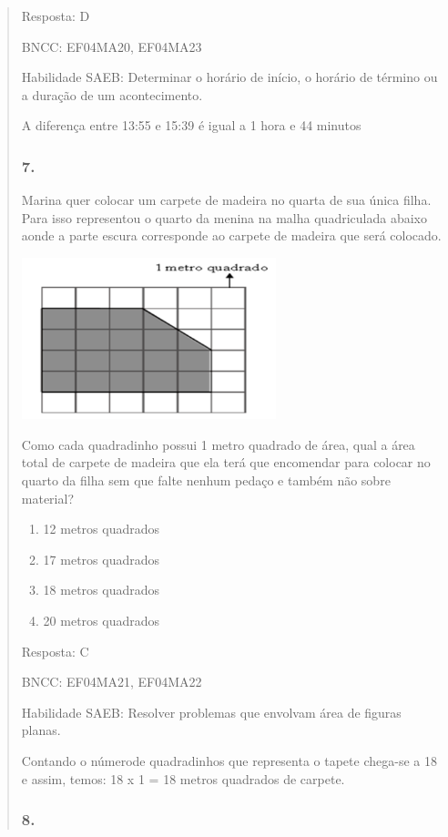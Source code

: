 \begin{enumerate}
\begin{escolha}
\begin{enumerate}
\begin{itemize}
\begin{itemize}
\begin{escolha}
\begin{quote}
\begin{escolha}
{Resposta: D

BNCC: EF04MA20, EF04MA23

Habilidade SAEB: Determinar o horário de início, o horário de término ou
a duração de um acontecimento.

A diferença entre 13:55 e 15:39 é igual a 1 hora e 44 minutos

\subsubsection{7. }\label{section-178}

Marina quer colocar um carpete de madeira no quarta de sua única filha.
Para isso representou o quarto da menina na malha quadriculada abaixo
aonde a parte escura corresponde ao carpete de madeira que será
colocado.

\includegraphics[width=2.90385in,height=1.84662in]{media/image160.png}

Como cada quadradinho possui 1 metro quadrado de área, qual a área total
de carpete de madeira que ela terá que encomendar para colocar no quarto
da filha sem que falte nenhum pedaço e também não sobre material?

\begin{enumerate}
\def\labelenumi{\alph{enumi})}
\item
  12 metros quadrados
\item
  17 metros quadrados
\item
  18 metros quadrados
\item
  20 metros quadrados
\end{enumerate}

Resposta: C

BNCC: EF04MA21, EF04MA22

Habilidade SAEB: Resolver problemas que envolvam área de figuras planas.

Contando o númerode quadradinhos que representa o tapete chega-se a 18 e
assim, temos: 18 x 1 = 18 metros quadrados de carpete.

\subsubsection{8. }\label{section-179}

}
\end{escolha}
\end{quote}
\end{escolha}
\end{itemize}
\end{itemize}
\end{enumerate}
\end{escolha}
\end{enumerate}
